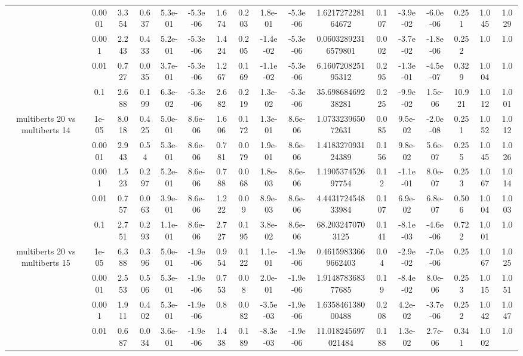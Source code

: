 \begin{tabular}{|c|c|c|c|c|c|c|c|c|c|c|c|c|c|c|c|c|}
 & 0.0001 & 3.354 & 0.637 & 5.3e-01 & -5.3e-06 & 1.674 & 0.203 & 1.8e-01 & -5.3e-06 & 1.621727228164672 & 0.107 & -3.9e-02 & -6.0e-06 & 0.251 & 1.045 & 1.029 \\
 & 0.001 & 2.243 & 0.433 & 5.2e-01 & -5.3e-06 & 1.424 & 0.205 & -1.4e-02 & -5.3e-06 & 0.06032892316579801 & 0.002 & -3.7e-02 & -1.8e-06 & 0.252 & 1.0 & 1.0 \\
 & 0.01 & 0.727 & 0.035 & 3.7e-01 & -5.3e-06 & 1.267 & 0.169 & -1.1e-02 & -5.3e-06 & 6.160720825195312 & 0.295 & -1.3e-01 & -4.5e-07 & 0.329 & 1.004 & 1.0 \\
 & 0.1 & 2.688 & 0.199 & 6.3e-02 & -5.3e-06 & 2.682 & 0.219 & 1.3e-02 & -5.3e-06 & 35.69868469238281 & 0.225 & -9.9e-02 & 1.5e-06 & 10.921 & 1.012 & 1.001 \\
\hline
\multirow{5}{*}{multiberts 20 vs multiberts 14} & 1e-05 & 8.018 & 0.425 & 5.0e-01 & 8.6e-06 & 1.606 & 0.172 & 1.3e-01 & 8.6e-06 & 1.073323965072631 & 0.085 & 9.5e-02 & -2.0e-08 & 0.251 & 1.052 & 1.012 \\
 & 0.0001 & 2.943 & 0.54 & 5.3e-01 & 8.6e-06 & 0.781 & 0.079 & 1.9e-01 & 8.6e-06 & 1.418327093124389 & 0.156 & 9.8e-02 & 5.6e-07 & 0.255 & 1.045 & 1.026 \\
 & 0.001 & 1.523 & 0.297 & 5.2e-01 & 8.6e-06 & 0.788 & 0.068 & 1.8e-03 & 8.6e-06 & 1.190537452697754 & 0.12 & -1.1e-01 & 8.0e-07 & 0.253 & 1.067 & 1.014 \\
 & 0.01 & 0.757 & 0.063 & 3.9e-01 & 8.6e-06 & 1.222 & 0.09 & 8.9e-03 & 8.6e-06 & 4.443172454833984 & 0.107 & 6.9e-02 & 6.8e-07 & 0.506 & 1.004 & 1.003 \\
 & 0.1 & 2.751 & 0.293 & 1.1e-01 & 8.6e-06 & 2.727 & 0.195 & 3.8e-02 & 8.6e-06 & 68.2032470703125 & 0.141 & -8.1e-03 & -4.6e-06 & 0.722 & 1.001 & 1.0 \\
\hline
\multirow{5}{*}{multiberts 20 vs multiberts 15} & 1e-05 & 6.388 & 0.396 & 5.0e-01 & -1.9e-06 & 0.954 & 0.122 & 1.1e-01 & -1.9e-06 & 0.46159833669662403 & 0.04 & -2.9e-02 & -7.0e-06 & 0.25 & 1.067 & 1.025 \\
 & 0.0001 & 2.553 & 0.506 & 5.3e-01 & -1.9e-06 & 0.753 & 0.08 & 2.0e-01 & -1.9e-06 & 1.914878368377685 & 0.19 & -8.4e-02 & 8.0e-06 & 0.253 & 1.015 & 1.051 \\
 & 0.001 & 1.911 & 0.402 & 5.3e-01 & -1.9e-06 & 0.8 & 0.082 & -3.5e-03 & -1.9e-06 & 1.635846138000488 & 0.208 & 4.2e-02 & -3.7e-06 & 0.252 & 1.042 & 1.047 \\
 & 0.01 & 0.687 & 0.034 & 3.6e-01 & -1.9e-06 & 1.438 & 0.189 & -8.3e-03 & -1.9e-06 & 11.018245697021484 & 0.188 & 1.3e-02 & 2.7e-06 & 0.341 & 1.002 & 1.0 \\

\end{tabular}
